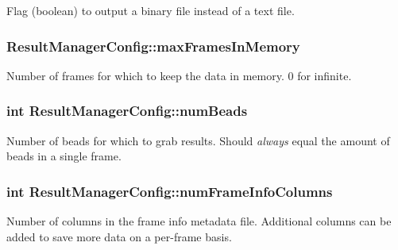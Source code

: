 Flag (boolean) to output a binary file instead of a text file. 

\subsubsection[{\texorpdfstring{max\+Frames\+In\+Memory}{maxFramesInMemory}}]{ Result\+Manager\+Config\+::max\+Frames\+In\+Memory}\hypertarget{struct_result_manager_config_a11b7dd434bb6477aad45198b76593f59}{}\label{struct_result_manager_config_a11b7dd434bb6477aad45198b76593f59}


Number of frames for which to keep the data in memory. 0 for infinite. 

\subsubsection[{\texorpdfstring{num\+Beads}{numBeads}}]{\setlength{\rightskip}{0pt plus 5cm}int Result\+Manager\+Config\+::num\+Beads}\hypertarget{struct_result_manager_config_a790ecadd32a0c0242cb002752af806af}{}\label{struct_result_manager_config_a790ecadd32a0c0242cb002752af806af}


Number of beads for which to grab results. Should {\itshape always} equal the amount of beads in a single frame. 

\subsubsection[{\texorpdfstring{num\+Frame\+Info\+Columns}{numFrameInfoColumns}}]{\setlength{\rightskip}{0pt plus 5cm}int Result\+Manager\+Config\+::num\+Frame\+Info\+Columns}\hypertarget{struct_result_manager_config_a97e9e26724a91e3a6757957f18b8f8b7}{}\label{struct_result_manager_config_a97e9e26724a91e3a6757957f18b8f8b7}


Number of columns in the frame info metadata file. Additional columns can be added to save more data on a per-\/frame basis. 

